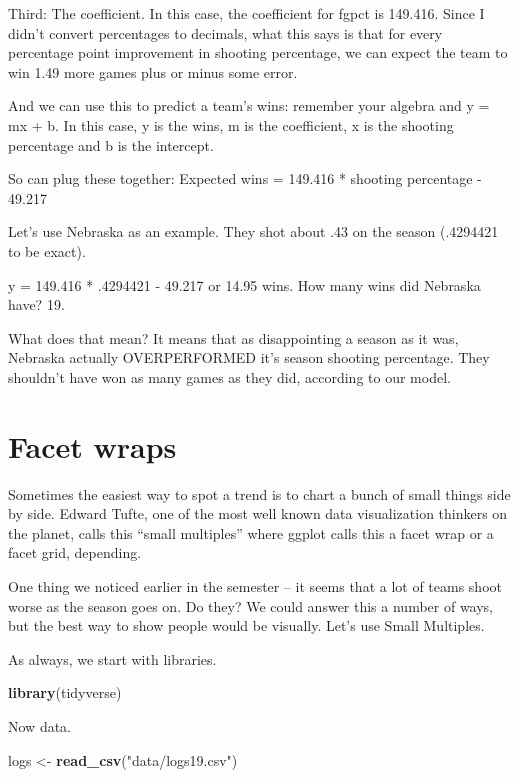 \documentclass[]{book}
\newenvironment{Shaded}{\begin{snugshade}}{\end{snugshade}}
\newcommand{\KeywordTok}[1]{\textcolor[rgb]{0.13,0.29,0.53}{\textbf{#1}}}
\newcommand{\NormalTok}[1]{#1}
\newcommand{\StringTok}[1]{\textcolor[rgb]{0.31,0.60,0.02}{#1}}
\begin{document}
Third: The coefficient. In this case, the coefficient for fgpct is 149.416. Since I didn't convert percentages to decimals, what this says is that for every percentage point improvement in shooting percentage, we can expect the team to win 1.49 more games plus or minus some error.

And we can use this to predict a team's wins: remember your algebra and y = mx + b. In this case, y is the wins, m is the coefficient, x is the shooting percentage and b is the intercept.

So can plug these together: Expected wins = 149.416 * shooting percentage - 49.217

Let's use Nebraska as an example. They shot about .43 on the season (.4294421 to be exact).

y = 149.416 * .4294421 - 49.217 or 14.95 wins. How many wins did Nebraska have? 19.

What does that mean? It means that as disappointing a season as it was, Nebraska actually OVERPERFORMED it's season shooting percentage. They shouldn't have won as many games as they did, according to our model.

\hypertarget{facet-wraps}{%
\chapter{Facet wraps}\label{facet-wraps}}

Sometimes the easiest way to spot a trend is to chart a bunch of small things side by side. Edward Tufte, one of the most well known data visualization thinkers on the planet, calls this ``small multiples'' where ggplot calls this a facet wrap or a facet grid, depending.

One thing we noticed earlier in the semester -- it seems that a lot of teams shoot worse as the season goes on. Do they? We could answer this a number of ways, but the best way to show people would be visually. Let's use Small Multiples.

As always, we start with libraries.

\begin{Shaded}
\begin{Highlighting}[]
\KeywordTok{library}\NormalTok{(tidyverse)}
\end{Highlighting}
\end{Shaded}

Now data.

\begin{Shaded}
\begin{Highlighting}[]
\NormalTok{logs <-}\StringTok{ }\KeywordTok{read_csv}\NormalTok{(}\StringTok{"data/logs19.csv"}\NormalTok{)}
\end{Highlighting}
\end{Shaded}
\end{document}
